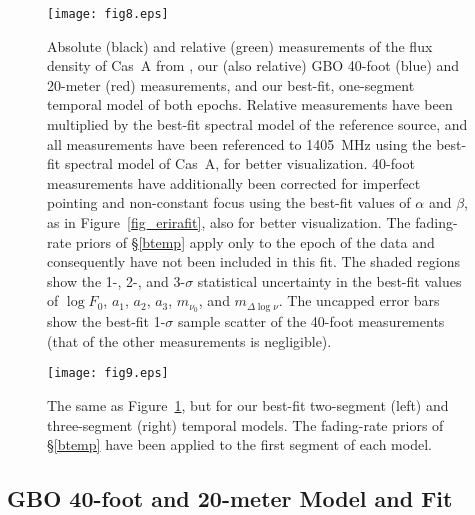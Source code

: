 \documentclass[fleqn,usenatbib]{mnras}
\begin{document}
\begin{figure}
\begin{center}
\texttt{[image: fig8.eps]}
\caption{Absolute (black) and relative (green) measurements of the flux density of Cas~A from \citet{b77}, our (also relative) GBO 40-foot (blue) and 20-meter (red) measurements, and our best-fit, one-segment temporal model of both epochs.  Relative measurements have been multiplied by the best-fit spectral model of the reference source, and all measurements have been referenced to 1405~MHz using the best-fit spectral model of Cas~A, for better visualization.  40-foot measurements have additionally been corrected for imperfect pointing and non-constant focus using the best-fit values of $\alpha$ and $\beta$, as in Figure~\ref{fig_erirafit}, also for better visualization.  The fading-rate priors of \S\ref{btemp} apply only to the epoch of the \citet{b77} data and consequently have not been included in this fit.  The shaded regions show the 1-, 2-, and 3-$\sigma$ statistical uncertainty in the best-fit values of $\log F_0$, $a_1$, $a_2$, $a_3$, $m_{\nu_0}$, and $m_{\Delta\log\nu}$.  The uncapped error bars show the best-fit 1-$\sigma$ sample scatter of the 40-foot measurements (that of the other measurements is negligible).}
\label{fig-single}
\end{center}
\end{figure}

\begin{figure*}
\begin{center}
\texttt{[image: fig9.eps]}
\caption{The same as Figure~\ref{fig-single}, but for our best-fit two-segment (left) and three-segment (right) temporal models.  The fading-rate priors of \S\ref{btemp} have been applied to the first segment of each model.}
\label{fig-ball}
\end{center}
\end{figure*}

\subsection{GBO 40-foot and 20-meter Model and Fit} \label{40ftresults}
\end{document}
